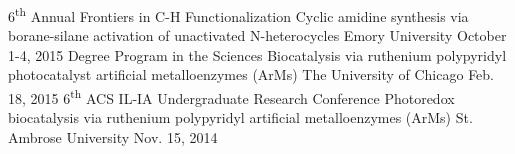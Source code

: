 
\begin{cventries}
	\cvtalk
		{6\textsuperscript{th} Annual Frontiers in C-H Functionalization} %
		{Cyclic amidine synthesis via borane-silane activation of unactivated N-heterocycles} %
		{Emory University}%
		{October 1-4, 2015} %
    {
    }
	\vspace{-0.5em}
	\cvtalk
		{Degree Program in the Sciences} %
		{Biocatalysis via ruthenium polypyridyl photocatalyst artificial metalloenzymes (ArMs)} %
		{The University of Chicago}%
		{Feb. 18, 2015} %
    {
    }
	\vspace{-0.5em}
	\cvtalk
		{6\textsuperscript{th} ACS IL-IA Undergraduate Research Conference} %
		{Photoredox biocatalysis via ruthenium polypyridyl artificial metalloenzymes (ArMs)} %
		{St. Ambrose University}%
		{Nov. 15, 2014} %
    {
    }
	\vspace{-0.5em}
\end{cventries}